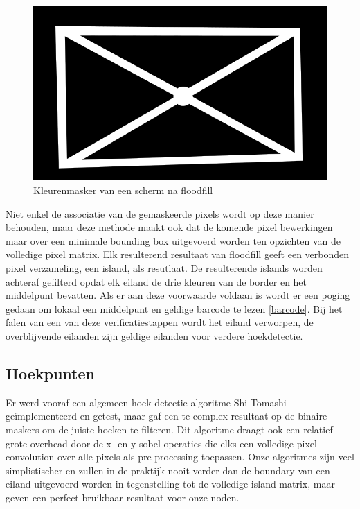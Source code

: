 \begin{figure}[H]
\centering
\includegraphics[scale=0.5]{img/mask.png}
\caption{Kleurenmasker van een scherm na floodfill}
\end{figure}

\noindent
Niet enkel de associatie van de gemaskeerde pixels wordt op deze manier behouden, maar deze methode maakt ook dat de komende pixel bewerkingen maar over een minimale bounding box uitgevoerd worden ten opzichten van de volledige pixel matrix. Elk resulterend resultaat van floodfill geeft een verbonden pixel verzameling, een island, als resutlaat. De resulterende islands worden achteraf gefilterd opdat elk eiland de drie kleuren van de border en het middelpunt bevatten. Als er aan deze voorwaarde voldaan is wordt er een poging gedaan om lokaal een middelpunt en geldige barcode te lezen \ref{barcode}. Bij het falen van een van deze verificatiestappen wordt het eiland verworpen, de overblijvende eilanden zijn geldige eilanden voor verdere hoekdetectie.

\subsection{Hoekpunten}
Er werd vooraf een algemeen hoek-detectie algoritme Shi-Tomashi \cite{shi-tomashi} geïmplementeerd en getest, maar gaf een te complex resultaat op de binaire maskers om de juiste hoeken te filteren. Dit algoritme draagt ook een relatief grote overhead door de x- en y-sobel operaties die elks een volledige pixel convolution over alle pixels als pre-processing toepassen. Onze algoritmes zijn veel simplistischer en zullen in de praktijk nooit verder dan de boundary van een eiland uitgevoerd worden in tegenstelling tot de volledige island matrix, maar geven een perfect bruikbaar resultaat voor onze noden.

